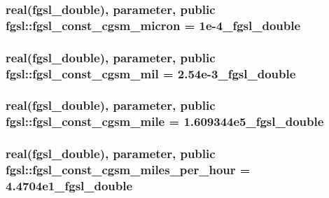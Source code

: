 \hypertarget{classfgsl_afa1f606b298574904dc1963ed870db4b}{
\subsubsection[{fgsl\-\_\-const\-\_\-cgsm\-\_\-micron}]{\setlength{\rightskip}{0pt plus 5cm}real({\bf fgsl\-\_\-double}), parameter, public fgsl\-::fgsl\-\_\-const\-\_\-cgsm\-\_\-micron = 1e-\/4\-\_\-fgsl\-\_\-double}}\label{classfgsl_afa1f606b298574904dc1963ed870db4b}
\hypertarget{classfgsl_afa02507efeb6d20012bb31b69efa6291}{
\subsubsection[{fgsl\-\_\-const\-\_\-cgsm\-\_\-mil}]{\setlength{\rightskip}{0pt plus 5cm}real({\bf fgsl\-\_\-double}), parameter, public fgsl\-::fgsl\-\_\-const\-\_\-cgsm\-\_\-mil = 2.\-54e-\/3\-\_\-fgsl\-\_\-double}}\label{classfgsl_afa02507efeb6d20012bb31b69efa6291}
\hypertarget{classfgsl_a56582420eb5e22fb229cf4eea9cb3fca}{
\subsubsection[{fgsl\-\_\-const\-\_\-cgsm\-\_\-mile}]{\setlength{\rightskip}{0pt plus 5cm}real({\bf fgsl\-\_\-double}), parameter, public fgsl\-::fgsl\-\_\-const\-\_\-cgsm\-\_\-mile = 1.\-609344e5\-\_\-fgsl\-\_\-double}}\label{classfgsl_a56582420eb5e22fb229cf4eea9cb3fca}
\hypertarget{classfgsl_a021d66524bb3e4b9305ce5399f11f2ec}{
\subsubsection[{fgsl\-\_\-const\-\_\-cgsm\-\_\-miles\-\_\-per\-\_\-hour}]{\setlength{\rightskip}{0pt plus 5cm}real({\bf fgsl\-\_\-double}), parameter, public fgsl\-::fgsl\-\_\-const\-\_\-cgsm\-\_\-miles\-\_\-per\-\_\-hour = 4.\-4704e1\-\_\-fgsl\-\_\-double}}\label{classfgsl_a021d66524bb3e4b9305ce5399f11f2ec}
